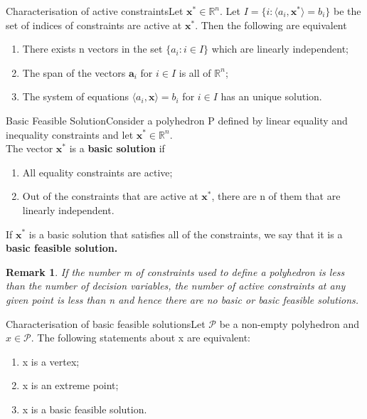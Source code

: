 \documentclass[twoside]{article}
\newtheorem{remark}[theorem]{Remark}
\begin{document}
\begin{theorem_exam}{Characterisation of active constraints}{}Let $\textbf{x}^* \in \mathbb{R}^n$. Let $I = \{i: \langle a_i, \textbf{x}^*\rangle = b_i\}$ be the set of indices of constraints are active at $\textbf{x}^*$. Then the following are equivalent 
\begin{enumerate}
    \item There exists n vectors in the set $\{a_i: i \in I\}$ which are linearly independent; 
    \item The span of the vectors $\textbf{a}_i$ for $i \in I$ is all of $\mathbb{R}^n$;
    \item The system of equations $\langle a_i, \textbf{x} \rangle = b_i$ for $i \in I$ has an unique solution.
\end{enumerate}
\end{theorem_exam}



\begin{definition_exam}{Basic Feasible Solution}{}Consider a polyhedron P defined by linear equality and inequality constraints and let $\textbf{x}^* \in \mathbb{R}^n$.\\ The vector $\textbf{x}^*$ is a \textbf{basic solution} if 
\begin{enumerate}
    \item All equality constraints are active;
    \item Out of the constraints that are active at $\textbf{x}^*$, there are n of them that are linearly independent.
\end{enumerate}If $\textbf{x}^*$ is a basic solution that satisfies all of the constraints, we say that it is a \textbf{basic feasible solution.}
\end{definition_exam}


\begin{remark}If the number m of constraints used to define a polyhedron is less than the number of decision variables, the number of active constraints at any given point is less than n and hence there are no basic or basic feasible solutions.
\end{remark}

\begin{theorem_exam}{Characterisation of basic feasible solutions}{}Let $\mathcal{P}$ be a non-empty polyhedron and $x \in \mathcal{P}$. The following statements about x are equivalent:
\begin{enumerate}
    \item x is a vertex;
    \item x is an extreme point;
    \item x is a basic feasible solution.
\end{enumerate}
\end{theorem_exam}
\end{document}
